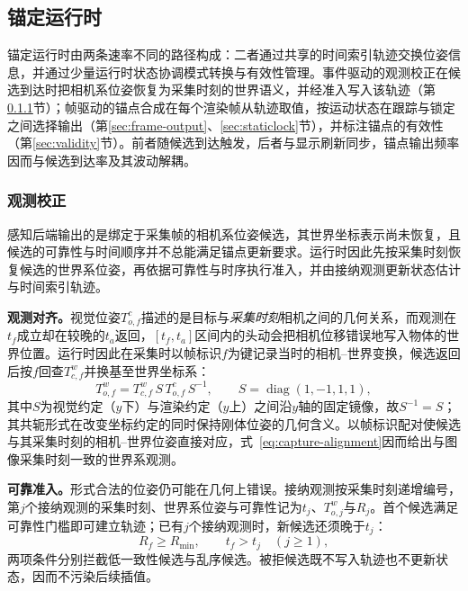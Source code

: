 \documentclass[review]{vgtc}
\begin{document}
\subsection{锚定运行时}\label{sec:anchoring}

锚定运行时由两条速率不同的路径构成：二者通过共享的时间索引轨迹交换位姿信息，并通过少量运行时状态协调模式转换与有效性管理。事件驱动的观测校正在候选到达时把相机系位姿恢复为采集时刻的世界语义，并经准入写入该轨迹（第\ref{sec:obs-update}节）；帧驱动的锚点合成在每个渲染帧从轨迹取值，按运动状态在跟踪与锁定之间选择输出（第\ref{sec:frame-output}、\ref{sec:staticlock}节），并标注锚点的有效性（第\ref{sec:validity}节）。前者随候选到达触发，后者与显示刷新同步，锚点输出频率因而与候选到达率及其波动解耦。

\subsubsection{观测校正}\label{sec:obs-update}

感知后端输出的是绑定于采集帧的相机系位姿候选，其世界坐标表示尚未恢复，且候选的可靠性与时间顺序并不总能满足锚点更新要求。运行时因此先按采集时刻恢复候选的世界系位姿，再依据可靠性与时序执行准入，并由接纳观测更新状态估计与时间索引轨迹。

\textbf{观测对齐。}视觉位姿$T_{o,f}^{c}$描述的是目标与\emph{采集时刻}相机之间的几何关系，而观测在$t_f$成立却在较晚的$t_a$返回，$[t_f, t_a]$区间内的头动会把相机位移错误地写入物体的世界位置。运行时因此在采集时以帧标识$f$为键记录当时的相机--世界变换，候选返回后按$f$回查$T_{c,f}^{w}$并换基至世界坐标系：
\begin{equation}
T_{o,f}^{w} = T_{c,f}^{w}\, S\, T_{o,f}^{c}\, S^{-1}, \qquad S = \operatorname{diag}(1,-1,1,1),
\label{eq:capture-alignment}
\end{equation}
其中$S$为视觉约定（$y$下）与渲染约定（$y$上）之间沿$y$轴的固定镜像，故$S^{-1}=S$；其共轭形式在改变坐标约定的同时保持刚体位姿的几何含义。以帧标识配对使候选与其采集时刻的相机--世界位姿直接对应，式~\eqref{eq:capture-alignment}因而给出与图像采集时刻一致的世界系观测。

\textbf{可靠准入。}形式合法的位姿仍可能在几何上错误。接纳观测按采集时刻递增编号，第$j$个接纳观测的采集时刻、世界系位姿与可靠性记为$t_j$、$T_{o,j}^{w}$与$R_j$。首个候选满足可靠性门槛即可建立轨迹；已有$j$个接纳观测时，新候选还须晚于$t_j$：
\begin{equation}
R_f \geq R_{\min}, \qquad t_f > t_j \quad (j \geq 1),
\label{eq:admission}
\end{equation}
两项条件分别拦截低一致性候选与乱序候选。被拒候选既不写入轨迹也不更新状态，因而不污染后续插值。
\end{document}
